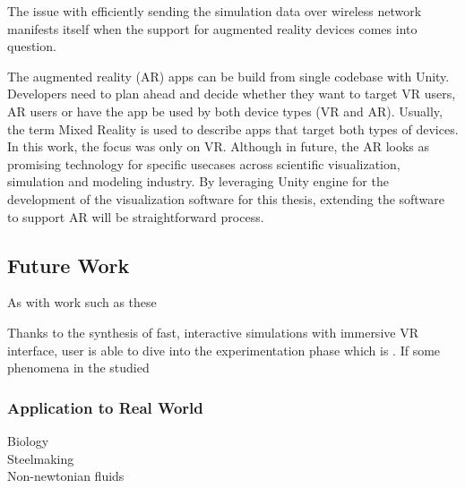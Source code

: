 The issue with efficiently sending the simulation data over wireless network manifests itself when the support for augmented reality devices comes into question.

The augmented reality (AR) apps can be build from single codebase with Unity. Developers need to plan ahead and decide whether they want to target VR users, AR users or have the app be used by both device types (VR and AR). Usually, the term Mixed Reality is used to describe apps that target both types of devices. In this work, the focus was only on VR. Although in future, the AR looks as promising technology for specific usecases across scientific visualization, simulation and modeling industry. By leveraging Unity engine for the development of the visualization software for  this thesis, extending the software to support AR will be straightforward process.


\subsection{Future Work}

As with work such as these

Thanks to the synthesis of fast, interactive simulations with immersive VR interface, user is able to dive into the experimentation phase which is . If some phenomena in the studied 




\subsubsection{Application to Real World}

Biology \\
Steelmaking \\
Non-newtonian fluids \\



%

